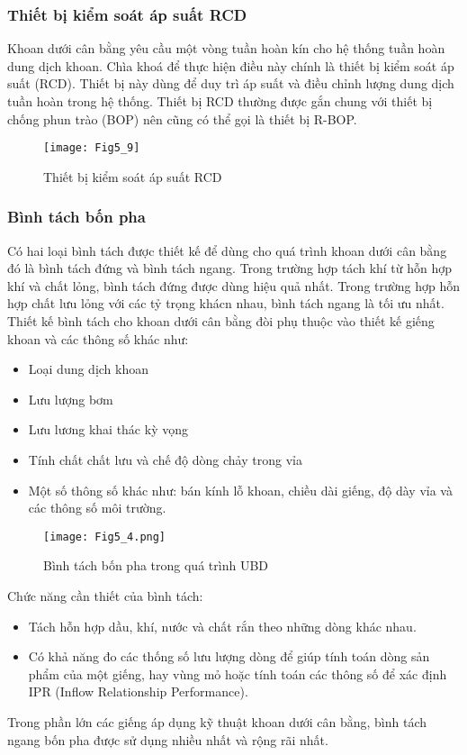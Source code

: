 \documentclass[12pt,a4paper]{article}
\begin{document}
\subsubsection{Thiết bị kiểm soát áp suất RCD}
Khoan dưới cân bằng yêu cầu một vòng tuần hoàn kín cho hệ thống tuần hoàn dung dịch khoan. Chìa khoá để thực hiện điều này chính là thiết bị kiểm soát áp suất (RCD). Thiết bị này dùng để duy trì áp suất và điều chỉnh lượng dung dịch tuần hoàn trong hệ thống.
Thiết bị RCD thường được gắn chung với thiết bị chống phun trào (BOP) nên cũng có thể gọi là thiết bị R-BOP.
\clearpage
\begin{figure}
\centering
\texttt{[image: Fig5\_9]}
\caption{Thiết bị kiểm soát áp suất RCD\cite{nikoofard2016control}}
\end{figure}

\subsubsection{Bình tách bốn pha}
Có hai loại bình tách được thiết kế để dùng cho quá trình khoan dưới cân bằng đó là bình tách đứng và bình tách ngang.
Trong trường hợp tách khí từ hỗn hợp khí và chất lỏng, bình tách đứng được dùng hiệu quả nhất.
Trong trường hợp hỗn hợp chất lưu lỏng với các tỷ trọng khácn nhau, bình tách ngang là tối ưu nhất.
Thiết kế bình tách cho khoan dưới cân bằng đòi phụ thuộc vào thiết kế giếng khoan và các thông số khác như:
\begin{itemize}
	\item Loại dung dịch khoan
	\item Lưu lượng bơm
	\item Lưu lương khai thác kỳ vọng
	\item Tính chất chất lưu và chế độ dòng chảy trong vỉa
	\item Một số thông số khác như: bán kính lỗ khoan, chiều dài giếng, độ dày vỉa và các thông số môi trường.
\end{itemize}
\begin{figure}[h]
	\centering
	\texttt{[image: Fig5\_4.png]}
	\caption{Bình tách bốn pha trong quá trình UBD\cite{ramalho2007changing}}
\end{figure}
Chức năng cần thiết của bình tách\cite{ramalho2007changing}:
\begin{itemize}
	\item Tách hỗn hợp dầu, khí, nước và chất rắn theo những dòng khác nhau.
	\item Có khả năng đo các thống số lưu lượng dòng để giúp tính toán dòng sản phẩm của một giếng, hay vùng mỏ hoặc tính toán các thông số để xác định IPR (Inflow Relationship Performance).
\end{itemize}
Trong phần lớn các giếng áp dụng kỹ thuật khoan dưới cân bằng, bình tách ngang bốn pha được sử dụng nhiều nhất và rộng rãi nhất.
\end{document}
